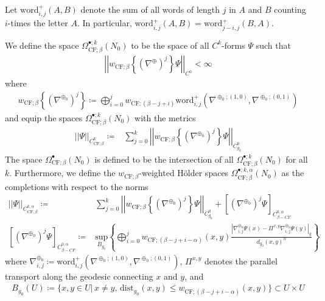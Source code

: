 \documentclass[psamsfonts]{amsart}
\theoremstyle{plain}
\theoremstyle{definition}{
\newtheorem{defi}{Definition}[section]
\newtheorem{ass}{Assumption}
\newtheorem*{nota}{Notation}}
\theoremstyle{remark}{
\newtheorem{rem}{Remark}
\newtheorem{ex}{Example}}
\theoremstyle{plain}{
\newtheorem{thm}{Theorem}[section]
\newtheorem{lem}{Lemma}[section]
\newtheorem{cor}{Corollary}[section]
\newtheorem{prop}{Proposition}[section]
\newtheorem{con}{Conjecture}[section]}
\newcommand{\m}[1]{{\mathrm{#1}}}
\begin{document}
\begin{nota}
Let $\m{word}^+_{i,j}(A,B)$ denote the sum of all words of length $j$ in $A$ and $B$ counting $i$-times the letter $A$. In particular, $\m{word}^+_{i,j}(A,B)=\m{word}^+_{j-i,j}(B,A)$. 
\end{nota}

\begin{defi}
 We define the space $ \Omega^{\bullet;k}_{\m{CF};\beta}(N_0)$ to be the space of all $C^k$-forms $\Psi$ such that 
\begin{align*}
    \left|\left|w_{\m{CF};\beta}\left\{(\nabla^{\oplus})^j\right\}\Psi\right|\right|_{C^0}<\infty
\end{align*}
where 
\begin{align*}
    w_{\m{CF};\beta}\left\{(\nabla^{\oplus_0})^j\right\}\coloneqq \bigoplus_{i=0}^jw_{\m{CF};(\beta-j+i)}\m{word}^+_{i,j}(\nabla^{\oplus_0;(1,0)},\nabla^{\oplus_0;(0,1)}) 
\end{align*}
and equip the spaces $ \Omega^{\bullet;k}_{\m{CF};\beta}(N_0)$ with the metrics
\begin{align*}
    \left|\left|\Psi\right|\right|_{C^{k}_{\m{CF};\beta}}\coloneqq&\sum_{j=0}^k\left|\left|w_{\m{CF};\beta}\left\{(\nabla^{\oplus_0})^j\right\}\Psi\right|\right|_{C^0_{g_0}}
\end{align*}
The space $ \Omega^{\bullet}_{\m{CF};\beta}(N_0)$ is defined to be the intersection of all $ \Omega^{\bullet;k}_{\m{CF};\beta}(N_0)$ for all $k$. Furthermore, we define the $w_{\m{CF};\beta}$-weighted Hölder spaces $  \Omega^{\bullet;k,\alpha}_{\m{CF};\beta}(N_0)$ as the completions with respect to the norms 
\begin{align*}
    \left|\left|\Psi\right|\right|_{C^{k,\alpha}_{\m{CF};\beta}}\coloneqq&\sum_{j=0}^k\left|\left|w_{\m{CF};\beta}\left\{(\nabla^{\oplus_0})^j\right\}\Psi\right|\right|_{C^0_{g_0}}+[(\nabla^{\oplus_0})^j\Psi]_{C^{0,\alpha}_{\beta-CF}}\\
[(\nabla^{\oplus_0})^j\Psi]_{C^{0,\alpha}_{\beta-CF}}\coloneqq&\underset{B_{g_0}}{\m{sup}}\left\{\bigoplus_{i=0}^jw_{\m{CF};(\beta-j+i-\alpha)}(x,y)\frac{\left|\nabla^{\oplus_0}_{i,j}\Psi(x)-\Pi^{x,y}\nabla^{\oplus_0}_{i,j} \Psi(y)\right|_{g}}{d_{g_0}(x,y)^\alpha}\right\}
\end{align*}
where $\nabla^{\oplus_0}_{i,j}\coloneqq\m{word}^+_{i,j}(\nabla^{\oplus_0;(1,0)},\nabla^{\oplus_0;(0,1)}) $, $\Pi^{x,y}$ denotes the parallel transport along the geodesic connecting $x$ and $y$, and 
\begin{align*}
    B_{g_0}(U)\coloneqq\{x,y\in U|\,x\neq y,\,\m{dist}_{g_0}(x,y)\leq w_{\m{CF};(\beta-j+i-\alpha)}(x,y)\}\subset U\times U
\end{align*}
\end{defi}
\end{document}
